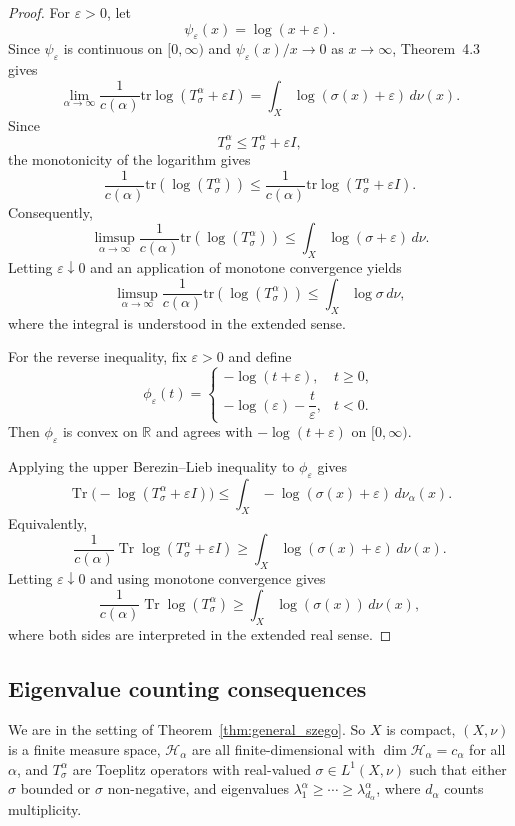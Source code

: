 \documentclass{amsart}
\theoremstyle{definition}
\theoremstyle{remark}
\numberwithin{equation}{section}
\newcommand{\tr}{\text{tr}} %
\newcommand{\calF}{\mathcal{F}}
\begin{document}
\begin{proof}
For $\varepsilon>0$, let
\[
 \psi_\varepsilon(x)=\log(x+\varepsilon).
\]
Since $\psi_\varepsilon$ is continuous on $[0,\infty)$ and
$\psi_\varepsilon(x)/x\to0$ as $x\to\infty$, Theorem~4.3 gives
\[
 \lim_{\alpha\to\infty}
 \frac{1}{c(\alpha)}
 \tr\log(T_\sigma^\alpha+\varepsilon I)
 =
 \int_X\log(\sigma(x)+\varepsilon)\,d\nu(x).
\]
Since
\[
 T_\sigma^\alpha\leq T_\sigma^\alpha+\varepsilon I,
\]
the monotonicity of the logarithm gives
\[
 \frac{1}{c(\alpha)}\text{tr}\left(\log\left( T_\sigma^\alpha\right)\right)
 \leq
 \frac{1}{c(\alpha)}
 \tr\log(T_\sigma^\alpha+\varepsilon I).
\]
Consequently,
\[
 \limsup_{\alpha\to\infty}
 \frac{1}{c(\alpha)}\text{tr}\left(\log\left( T_\sigma^\alpha\right)\right)
 \leq
 \int_X\log(\sigma+\varepsilon)\,d\nu.
\]
Letting $\varepsilon\downarrow0$ and an application of monotone convergence yields
\[
 \limsup_{\alpha\to\infty}
 \frac{1}{c(\alpha)}\text{tr}\left(\log\left( T_\sigma^\alpha\right)\right)
 \leq
 \int_X\log\sigma\,d\nu,
\]
where the integral is understood in the extended sense.

For the reverse inequality, fix $\varepsilon>0$ and define
\[
\phi_\varepsilon(t)
=
\begin{cases}
-\log(t+\varepsilon), & t\geq 0,\\[2mm]
-\log(\varepsilon)-\dfrac{t}{\varepsilon}, & t<0.
\end{cases}
\]
Then $\phi_\varepsilon$ is convex on $\mathbb{R}$ and agrees with
$-\log(t+\varepsilon)$ on $[0,\infty)$.

Applying the upper Berezin--Lieb inequality to
$\phi_\varepsilon$ gives
\[
\operatorname{Tr}\bigl(-\log(T_\sigma^\alpha+\varepsilon I)\bigr)
\leq
\int_X-\log(\sigma(x)+\varepsilon)\,d\nu_\alpha(x).
\]
Equivalently,
\[
\frac{1}{c(\alpha)}
\operatorname{Tr}\log(T_\sigma^\alpha+\varepsilon I)
\geq
\int_X\log(\sigma(x)+\varepsilon)\,d\nu(x).
\]
Letting $\varepsilon\downarrow0$ and using monotone convergence gives
\[
\frac{1}{c(\alpha)}
\operatorname{Tr}\log(T_\sigma^\alpha)
\geq
\int_X\log(\sigma(x))\,d\nu(x),
\]
where both sides are interpreted in the extended real sense.
\end{proof}



\subsection{Eigenvalue counting consequences} We are in the setting of Theorem~\ref{thm:general_szego}. So $X$ is compact, $(X,\nu)$ is a finite measure space, $\mathcal{H}_\alpha$ are all finite-dimensional  with 
$\dim \mathcal{H}_\alpha=c_\alpha$ for all $\alpha$,
and $T_\sigma^\alpha$ are Toeplitz operators with real-valued $\sigma\in L^1(X,\nu)$ such that either $\sigma$ bounded or $\sigma$ non-negative, and eigenvalues
\(\lambda_1^\alpha\ge\cdots\ge\lambda_{d_\alpha}^\alpha\), where $d_{\alpha}$ counts multiplicity. 
\end{document}
